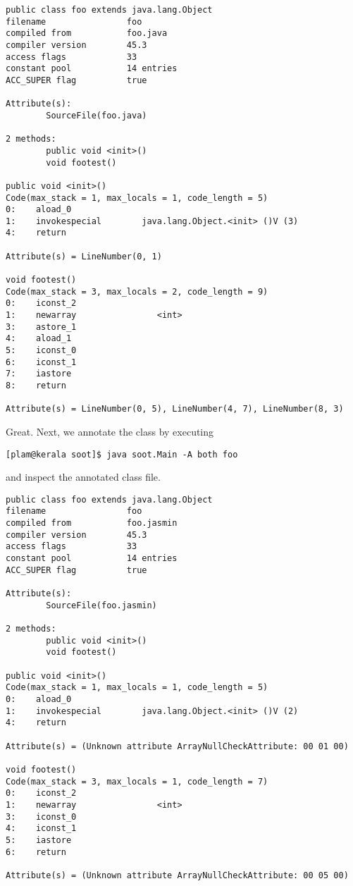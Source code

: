 \documentclass{article}
\begin{document}
\begin{verbatim}
public class foo extends java.lang.Object
filename                foo
compiled from           foo.java
compiler version        45.3
access flags            33
constant pool           14 entries
ACC_SUPER flag          true

Attribute(s):
        SourceFile(foo.java)

2 methods:
        public void <init>()
        void footest()

public void <init>()
Code(max_stack = 1, max_locals = 1, code_length = 5)
0:    aload_0
1:    invokespecial        java.lang.Object.<init> ()V (3)
4:    return

Attribute(s) = LineNumber(0, 1)

void footest()
Code(max_stack = 3, max_locals = 2, code_length = 9)
0:    iconst_2
1:    newarray                <int>
3:    astore_1
4:    aload_1
5:    iconst_0
6:    iconst_1
7:    iastore
8:    return

Attribute(s) = LineNumber(0, 5), LineNumber(4, 7), LineNumber(8, 3)
\end{verbatim}

Great.  Next, we annotate the class by executing
\begin{verbatim}
[plam@kerala soot]$ java soot.Main -A both foo
\end{verbatim}
and inspect the annotated class file.

\begin{verbatim}
public class foo extends java.lang.Object
filename                foo
compiled from           foo.jasmin
compiler version        45.3
access flags            33
constant pool           14 entries
ACC_SUPER flag          true

Attribute(s):
        SourceFile(foo.jasmin)

2 methods:
        public void <init>()
        void footest()

public void <init>()
Code(max_stack = 1, max_locals = 1, code_length = 5)
0:    aload_0
1:    invokespecial        java.lang.Object.<init> ()V (2)
4:    return

Attribute(s) = (Unknown attribute ArrayNullCheckAttribute: 00 01 00)

void footest()
Code(max_stack = 3, max_locals = 1, code_length = 7)
0:    iconst_2
1:    newarray                <int>
3:    iconst_0
4:    iconst_1
5:    iastore
6:    return

Attribute(s) = (Unknown attribute ArrayNullCheckAttribute: 00 05 00)
\end{verbatim}
\end{document}
